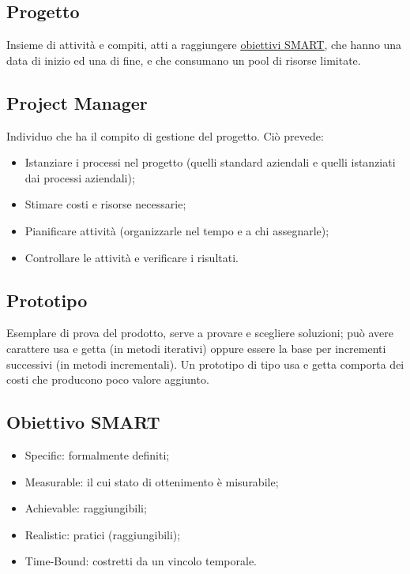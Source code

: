 	\subsection{Progetto}
	\label{sec:progetto}
	Insieme di attività e compiti, atti a raggiungere \underline{\hyperref[sec:smart]{obiettivi SMART}}, che hanno una data di inizio ed una di fine, e che consumano un pool di risorse limitate.	
	
	\subsection{Project Manager}
	\label{sec:projectmanager}
	Individuo che ha il compito di gestione del progetto. Ciò prevede:
	\begin{itemize}  
	\item Istanziare i processi nel progetto (quelli standard aziendali e quelli istanziati dai processi aziendali);
	\item Stimare costi e risorse necessarie;
	\item Pianificare attività (organizzarle nel tempo e a chi assegnarle);
	\item Controllare le attività e verificare i risultati.
	\end{itemize}	
		
	\subsection{Prototipo}
	\label{sec:prototipo}
	Esemplare di prova del prodotto, serve a provare e scegliere soluzioni; può avere carattere usa e getta (in metodi iterativi) oppure essere la base per incrementi successivi (in metodi incrementali).
	Un prototipo di tipo usa e getta comporta dei costi che producono poco valore aggiunto.\newpage	

		
	\subsection{Obiettivo SMART}
	\label{sec:smart}
	\begin{itemize}  
	\item Specific: formalmente definiti;
	\item Measurable: il cui stato di ottenimento è misurabile;
	\item Achievable: raggiungibili;
	\item Realistic: pratici (raggiungibili);
	\item Time-Bound: costretti da un vincolo temporale.
	\end{itemize}\newpage

